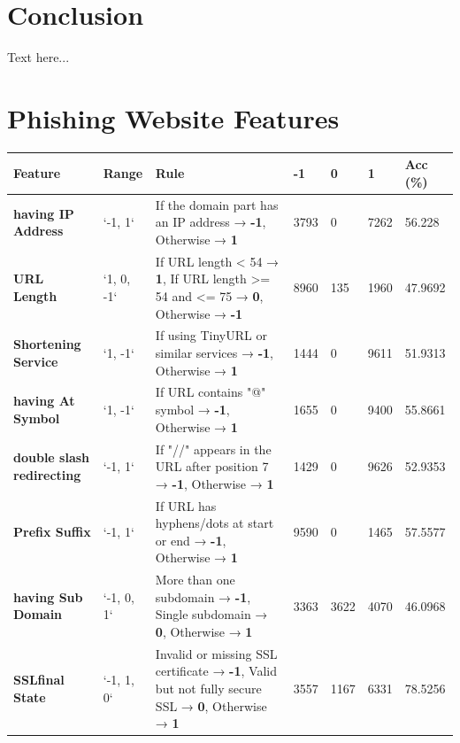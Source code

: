 \documentclass{sigkddExp}
\begin{document}
\section{Conclusion}
Text here...

%

\newpage
\appendix
\section{Phishing Website Features}

\begin{table}[h!]
\centering
\begin{tabular}{|p{3cm}|l|p{8cm}|l|l|l|l|}
\hline
\textbf{Feature} & \textbf{Range} & \textbf{Rule} & \textbf{-1} & \textbf{0} & \textbf{1} & \textbf{Acc (\%)} \\
\hline
\textbf{having IP Address} & `-1, 1` & If the domain part has an IP address → \textbf{-1}, Otherwise → \textbf{1} & 3793 & 0 & 7262 & 56.228 \\
\hline
\textbf{URL Length} & `1, 0, -1` & If URL length < 54 → \textbf{1}, If URL length >= 54 and <= 75 → \textbf{0}, Otherwise → \textbf{-1} & 8960 & 135 & 1960 & 47.9692 \\
\hline
\textbf{Shortening Service} & `1, -1` & If using TinyURL or similar services → \textbf{-1}, Otherwise → \textbf{1} & 1444 & 0 & 9611 & 51.9313 \\
\hline
\textbf{having At Symbol} & `1, -1` & If URL contains "@" symbol → \textbf{-1}, Otherwise → \textbf{1} & 1655 & 0 & 9400 & 55.8661 \\
\hline
\textbf{double slash redirecting} & `-1, 1` & If "//" appears in the URL after position 7 → \textbf{-1}, Otherwise → \textbf{1} & 1429 & 0 & 9626 & 52.9353 \\
\hline
\textbf{Prefix Suffix} & `-1, 1` & If URL has hyphens/dots at start or end → \textbf{-1}, Otherwise → \textbf{1} & 9590 & 0 & 1465 & 57.5577 \\
\hline
\textbf{having Sub Domain} & `-1, 0, 1` & More than one subdomain → \textbf{-1}, Single subdomain → \textbf{0}, Otherwise → \textbf{1} & 3363 & 3622 & 4070 & 46.0968 \\
\hline
\textbf{SSLfinal State} & `-1, 1, 0` & Invalid or missing SSL certificate → \textbf{-1}, Valid but not fully secure SSL → \textbf{0}, Otherwise → \textbf{1} & 3557 & 1167 & 6331 & 78.5256 \\

\end{tabular}
\end{table}
\end{document}
